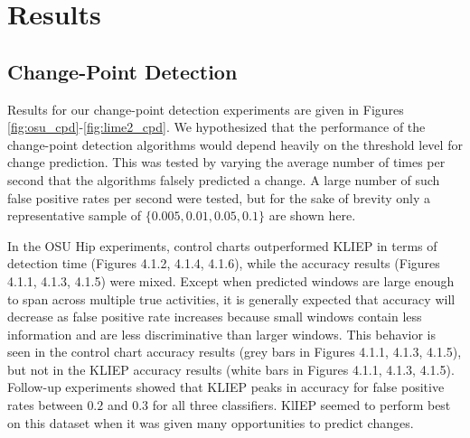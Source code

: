 \chapter{Results}
%

\section{Change-Point Detection}
Results for our change-point detection experiments are given in
Figures \ref{fig:osu_cpd}-\ref{fig:lime2_cpd}.
We hypothesized that the performance of the change-point detection algorithms
would depend heavily on the threshold level for change prediction. This was
tested by varying the average number of times per second that the algorithms
falsely predicted a change. A large number of such false positive rates per
second were tested, but for the sake of brevity only a representative sample
of $\{0.005, 0.01, 0.05, 0.1\}$ are shown here.

In the OSU Hip experiments, control charts outperformed KLIEP in terms of
detection time (Figures 4.1.2, 4.1.4, 4.1.6), while the accuracy results 
(Figures 4.1.1, 4.1.3, 4.1.5) were
mixed. Except when predicted windows are large enough to span across multiple
true activities, it is generally expected that accuracy will decrease as false
positive rate increases because small windows contain less information and are
less discriminative than larger windows. This behavior is seen in the control chart
accuracy results (grey bars in Figures 4.1.1, 4.1.3, 4.1.5), but not in the
KLIEP accuracy results (white bars in Figures 4.1.1, 4.1.3, 4.1.5).
Follow-up experiments showed that KLIEP peaks in accuracy for
false positive rates between $0.2$ and $0.3$ for all three classifiers.
KlIEP seemed to perform best on this dataset when it was given many
opportunities to predict changes.


